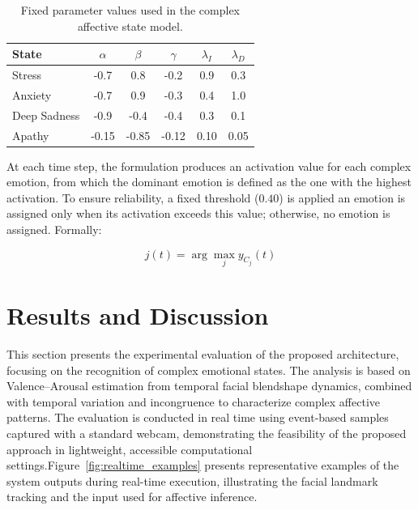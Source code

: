 \documentclass[letterpaper, 10 pt, conference]{ieeeconf}  %
\begin{document}
\begin{table}[htbp]
\caption{Fixed parameter values used in the complex affective state model.}
\label{tab:fixed_params}
\centering
\setlength{\tabcolsep}{4pt}
\renewcommand{\arraystretch}{1.05}
\small
\begin{tabular}{l c c c c c}
\hline
\textbf{State} & $\alpha$ & $\beta$ & $\gamma$ & $\lambda_I$ & $\lambda_D$ \\
\hline

Stress & -0.7 & 0.8 & -0.2 & 0.9 & 0.3 \\
Anxiety & -0.7 & 0.9 & -0.3 & 0.4 & 1.0 \\
Deep Sadness & -0.9 & -0.4 & -0.4 & 0.3 & 0.1 \\
Apathy & -0.15 & -0.85 & -0.12 & 0.10 & 0.05\\

\hline
\end{tabular}
\end{table}

At each time step, the formulation produces an activation value for each complex emotion, from which the dominant emotion is defined as the one with the highest activation. To ensure reliability, a fixed threshold ($0.40$) is applied an emotion is assigned only when its activation exceeds this value; otherwise, no emotion is assigned. Formally:

\begin{equation}
j(t) = \arg\max_j y_{C_j}(t)
\end{equation}


\section{Results and Discussion}

This section presents the experimental evaluation of the proposed architecture, focusing on the recognition of complex emotional states. The analysis is based on Valence–Arousal estimation from temporal facial blendshape dynamics, combined with temporal variation and incongruence to characterize complex affective patterns. The evaluation is conducted in real time using event-based samples captured with a standard webcam, demonstrating the feasibility of the proposed approach in lightweight, accessible computational settings.Figure~\ref{fig:realtime_examples} presents representative examples of the system outputs during real-time execution, illustrating the facial landmark tracking and the input used for affective inference.
\end{document}
